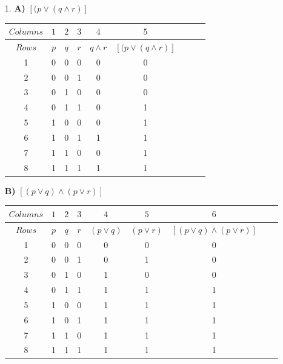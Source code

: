\documentclass[11pt]{article}
\theoremstyle{thmstyle}
\begin{document}

\thispagestyle{firstpage} %

\setlength{\abovedisplayskip}{20pt} %
\setlength{\belowdisplayskip}{20pt} %




\begin{itemize}\setlength{\itemsep}{1em} %
\item[1.]  
{\textbf{A) }}
$ [(p \vee (q \wedge r)]$

\begin{center}
\begin{tabular} {|c|c|c|c|c|c|c|c|c|}
\hline
$Columns$ & $1$ & $2$ & $3 $& $4$ & $5$  \\
\hline
$Rows$ &$ p $& $q $& $r $& $q \wedge r $& $ [(p \vee (q \wedge r)]$ \\
\hline
1 & 0 & 0 & 0 & 0 & 0 \\
\hline
2 & 0 & 0 & 1 & 0 & 0 \\
\hline
3 & 0 & 1 & 0 & 0 & 0 \\
\hline
4 & 0 & 1 & 1 & 0 & 1 \\
\hline
5 & 1 & 0 & 0 & 0 & 1 \\
\hline
6 & 1 & 0 & 1 & 1 & 1 \\
\hline
7 & 1 & 1 & 0 & 0 & 1 \\
\hline
8 & 1 & 1 & 1 & 1 & 1 \\
\hline


\end{tabular}
\end{center}





{\textbf{B) }}
$ [(p \vee q)\wedge (p\vee r)]$


\begin{center}
\begin{tabular} {|c|c|c|c|c|c|c|c|c|}
\hline
$Columns$ & $1$ & $2$ & $3 $& $4$ & $5$  & $6$  \\
\hline
$Rows$ &$ p $& $q $& $r $& $(p \vee q) $& $(p \vee r) $ & $ [(p \vee q)\wedge (p\vee r)]$
 \\
\hline
1 & 0 & 0 & 0 & 0 & 0 & 0 \\
\hline
2 & 0 & 0 & 1 & 0 & 1 & 0 \\
\hline
3 & 0 & 1 & 0 & 1 & 0 & 0 \\
\hline
4 & 0 & 1 & 1 & 1 & 1 & 1 \\
\hline
5 & 1 & 0 & 0 & 1 & 1 & 1 \\
\hline
6 & 1 & 0 & 1 & 1 & 1 & 1 \\
\hline
7 & 1 & 1 & 0 & 1 & 1 & 1 \\
\hline
8 & 1 & 1 & 1 & 1 & 1 & 1 \\
\hline






\end{tabular}
\end{center}
\end{itemize}
\end{document}
